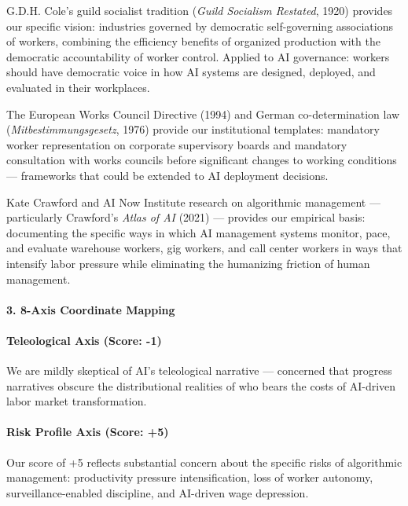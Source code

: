 G.D.H. Cole's guild socialist tradition (\emph{Guild Socialism
Restated}, 1920) provides our specific vision: industries governed by
democratic self-governing associations of workers, combining the
efficiency benefits of organized production with the democratic
accountability of worker control. Applied to AI governance: workers
should have democratic voice in how AI systems are designed, deployed,
and evaluated in their workplaces.

The European Works Council Directive (1994) and German co-determination
law (\emph{Mitbestimmungsgesetz}, 1976) provide our institutional
templates: mandatory worker representation on corporate supervisory
boards and mandatory consultation with works councils before significant
changes to working conditions --- frameworks that could be extended to
AI deployment decisions.

Kate Crawford and AI Now Institute research on algorithmic management
--- particularly Crawford's \emph{Atlas of AI} (2021) --- provides our
empirical basis: documenting the specific ways in which AI management
systems monitor, pace, and evaluate warehouse workers, gig workers, and
call center workers in ways that intensify labor pressure while
eliminating the humanizing friction of human management.

\paragraph{3. 8-Axis Coordinate
Mapping}\label{axis-coordinate-mapping-39}

\paragraph{Teleological Axis (Score:
-1)}\label{teleological-axis-score--1-4}

We are mildly skeptical of AI's teleological narrative --- concerned
that progress narratives obscure the distributional realities of who
bears the costs of AI-driven labor market transformation.

\paragraph{Risk Profile Axis (Score:
+5)}\label{risk-profile-axis-score-5-2}

Our score of +5 reflects substantial concern about the specific risks of
algorithmic management: productivity pressure intensification, loss of
worker autonomy, surveillance-enabled discipline, and AI-driven wage
depression.

